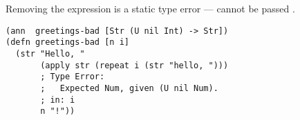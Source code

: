 Removing the  expression is a static type error
---  cannot be passed .

\begin{verbatim}
(ann  greetings-bad [Str (U nil Int) -> Str])
(defn greetings-bad [n i]
  (str "Hello, "
       (apply str (repeat i (str "hello, ")))
       ; Type Error:
       ;   Expected Num, given (U nil Num).
       ; in: i
       n "!"))
\end{verbatim}



%
%
%
%
%
%
%


